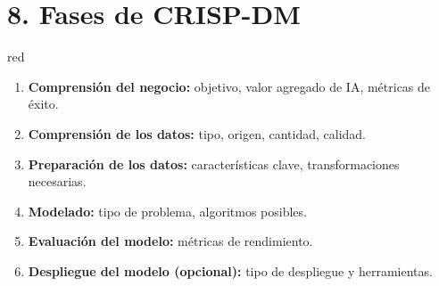 \section{8. Fases de CRISP-DM}
\label{sec:crispdm}


\begin{consigna}{red}
\begin{enumerate}
  \item \textbf{Comprensión del negocio:} objetivo, valor agregado de IA, métricas de éxito.
  \item \textbf{Comprensión de los datos:} tipo, origen, cantidad, calidad.
  \item \textbf{Preparación de los datos:} características clave, transformaciones necesarias.
  \item \textbf{Modelado:} tipo de problema, algoritmos posibles.
  \item \textbf{Evaluación del modelo:} métricas de rendimiento.
  \item \textbf{Despliegue del modelo (opcional):} tipo de despliegue y herramientas.
\end{enumerate}
\end{consigna}
